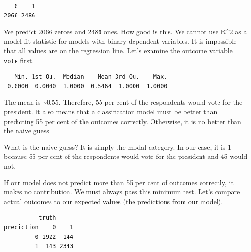 \documentclass[]{article}
\newenvironment{Shaded}{\begin{snugshade}}{\end{snugshade}}
\newcommand{\KeywordTok}[1]{\textcolor[rgb]{0.13,0.29,0.53}{\textbf{#1}}}
\newcommand{\DataTypeTok}[1]{\textcolor[rgb]{0.13,0.29,0.53}{#1}}
\newcommand{\StringTok}[1]{\textcolor[rgb]{0.31,0.60,0.02}{#1}}
\newcommand{\OperatorTok}[1]{\textcolor[rgb]{0.81,0.36,0.00}{\textbf{#1}}}
\newcommand{\NormalTok}[1]{#1}
\theoremstyle{definition}
\theoremstyle{definition}
\theoremstyle{definition}
\theoremstyle{remark}
\begin{document}
\begin{verbatim}

   0    1 
2066 2486 
\end{verbatim}

We predict 2066 zeroes and 2486 ones. How good is this. We cannot use
R\^{}2 as a model fit statistic for models with binary dependent
variables. It is impossible that all values are on the regression line.
Let's examine the outcome variable \texttt{vote} first.

\begin{Shaded}
\end{Shaded}

\begin{verbatim}
   Min. 1st Qu.  Median    Mean 3rd Qu.    Max. 
 0.0000  0.0000  1.0000  0.5464  1.0000  1.0000 
\end{verbatim}

The mean is \textasciitilde{}0.55. Therefore, 55 per cent of the
respondents would vote for the president. It also means that a
classification model must be better than predicting 55 per cent of the
outcomes correctly. Otherwise, it is no better than the naive guess.

What is the naive guess? It is simply the modal category. In our case,
it is 1 because 55 per cent of the respondents would vote for the
president and 45 would not.

If our model does not predict more than 55 per cent of outcomes
correctly, it makes no contribution. We must always pass this minimum
test. Let's compare actual outcomes to our expected values (the
predictions from our model).

\begin{Shaded}
\end{Shaded}

\begin{verbatim}
          truth
prediction    0    1
         0 1922  144
         1  143 2343
\end{verbatim}
\end{document}
